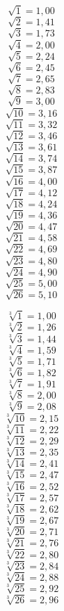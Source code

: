 \documentclass[8pt, a5paper]{extarticle}
\begin{document}
  \begin{multicols}{5}
  [
  ]
  {\footnotesize{{
    \[
          \sqrt{1} = 1,00
        \]
        \[
          \sqrt{2} = 1,41
        \]
        \[
          \sqrt{3} = 1,73
        \]
        \[
          \sqrt{4} = 2,00
        \]
        \[
          \sqrt{5} = 2,24
        \]
        \[
          \sqrt{6} = 2,45
        \]
        \[
          \sqrt{7} = 2,65
        \]
        \[
          \sqrt{8} = 2,83
        \]
        \[
          \sqrt{9} = 3,00
        \]
        \[
          \sqrt{10} = 3,16
        \]
        \[
          \sqrt{11} = 3,32
        \]
        \[
          \sqrt{12} = 3,46
        \]
        \[
          \sqrt{13} = 3,61
        \]
        \[
          \sqrt{14} = 3,74
        \]
        \[
          \sqrt{15} = 3,87
        \]
        \[
          \sqrt{16} = 4,00
        \]
        \[
          \sqrt{17} = 4,12
        \]
        \[
          \sqrt{18} = 4,24
        \]
        \[
          \sqrt{19} = 4,36
        \]
        \[
          \sqrt{20} = 4,47
        \]
        \[
          \sqrt{21} = 4,58
        \]
        \[
          \sqrt{22} = 4,69
        \]
        \[
          \sqrt{23} = 4,80
        \]
        \[
          \sqrt{24} = 4,90
        \]
        \[
          \sqrt{25} = 5,00
        \]
        \[
          \sqrt{26} = 5,10
        \]

        \[
          \sqrt[3]{1} = 1,00
        \]
        \[
          \sqrt[3]{2} = 1,26
        \]
        \[
          \sqrt[3]{3} = 1,44
        \]
        \[
          \sqrt[3]{4} = 1,59
        \]
        \[
          \sqrt[3]{5} = 1,71
        \]
        \[
          \sqrt[3]{6} = 1,82
        \]
        \[
          \sqrt[3]{7} = 1,91
        \]
        \[
          \sqrt[3]{8} = 2,00
        \]
        \[
          \sqrt[3]{9} = 2,08
        \]
        \[
          \sqrt[3]{10} = 2,15
        \]
        \[
          \sqrt[3]{11} = 2,22
        \]
        \[
          \sqrt[3]{12} = 2,29
        \]
        \[
          \sqrt[3]{13} = 2,35
        \]
        \[
          \sqrt[3]{14} = 2,41
        \]
        \[
          \sqrt[3]{15} = 2,47
        \]
        \[
          \sqrt[3]{16} = 2,52
        \]
        \[
          \sqrt[3]{17} = 2,57
        \]
        \[
          \sqrt[3]{18} = 2,62
        \]
        \[
          \sqrt[3]{19} = 2,67
        \]
        \[
          \sqrt[3]{20} = 2,71
        \]
        \[
          \sqrt[3]{21} = 2,76
        \]
        \[
          \sqrt[3]{22} = 2,80
        \]
        \[
          \sqrt[3]{23} = 2,84
        \]
        \[
          \sqrt[3]{24} = 2,88
        \]
        \[
          \sqrt[3]{25} = 2,92
        \]
        \[
          \sqrt[3]{26} = 2,96
        \]}}}

  \end{multicols}
\end{document}
